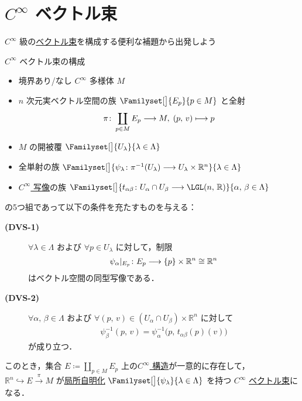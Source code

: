 \documentclass[TQFT_main]{subfiles}
\begin{document}
\section{$C^\infty$ ベクトル束}

$C^\infty$ 級の\hyperref[def:vect]{ベクトル束}を構成する便利な補題から出発しよう~\cite[p.253]{Lee2012smooth}

\begin{mylem}[label=lem:smooth-vect-chart,breakable]{$C^\infty$ ベクトル束の構成}
    \begin{itemize}
        \item 境界あり/なし $C^\infty$ 多様体 $M$
        \item $n$ 次元実ベクトル空間の族 $\Familyset[\big]{E_p}{p \in M}$ と全射
        \begin{align}
            \pi \colon \coprod_{p \in M} E_p \longrightarrow M,\; (p,\, v) \longmapsto p
        \end{align}
        \item $M$ の開被覆 $\Familyset[\big]{U_\lambda}{\lambda \in \Lambda}$
        \item 全単射の族 $\Familyset[\big]{\psi_\lambda \colon \pi^{-1}(U_\lambda) \lto U_\lambda \times \mathbb{R}^n}{\lambda \in \Lambda}$
        \item \underline{$C^\infty$ 写像}の族 $\Familyset[\big]{t_{\alpha\beta} \colon U_\alpha \cap U_\beta \lto \LGL(n,\, \mathbb{R})}{\alpha,\, \beta \in \Lambda}$
    \end{itemize}
    の5つ組であって以下の条件を充たすものを与える：
    \begin{description}
        \item[\textbf{(DVS-1)}] $\forall \lambda \in \Lambda$ および $\forall p \in U_\lambda$ に対して，制限
        \begin{align}
            \psi_\alpha|_{E_p} \colon E_p \longrightarrow \{p\} \times \mathbb{R}^n \cong \mathbb{R}^n
        \end{align}
        はベクトル空間の同型写像である．
        \item[\textbf{(DVS-2)}] $\forall \alpha,\, \beta \in \Lambda$ および $\forall (p,\, v) \in (U_\alpha \cap U_\beta) \times \mathbb{R}^n$ に対して
        \begin{align}
            \psi_\beta^{-1} (p,\, v) = \psi_\alpha^{-1} \bigl( p,\, t_{\alpha\beta}(p)(v) \bigr) 
        \end{align}
        が成り立つ．
    \end{description}
    このとき，集合 $E \coloneqq \coprod_{p \in M} E_p$ 上の\hyperref[lem:cinfty-chart]{$C^\infty$ 構造}が一意的に存在して，
    $\mathbb{R}^n \hookrightarrow E \xrightarrow{\pi} M$ が\hyperref[def.fiber-1]{局所自明化} $\Familyset[\big]{\psi_\lambda}{\lambda \in \Lambda}$ を持つ $C^\infty$ \hyperref[def:vect]{ベクトル束}になる．
\end{mylem}
\end{document}
